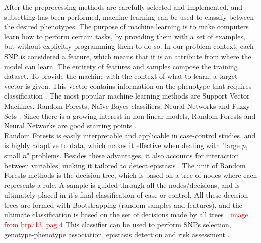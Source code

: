 After the preprocessing methods are carefully selected and implemented, and subsetting has been performed, machine learning can be used to classify between the desired phenotypes. The purpose of machine learning is to make computers learn how to perform certain tasks, by providing them with a set of examples, but without explicitly programming them to do so. In our problem context, each SNP is considered a feature, which means that it is an attribute from where the model can learn. The entirety of features and samples compose the training dataset. To provide the machine with the context of what to learn, a target vector is given. This vector contains information on the phenotype that requires classification \cite{nelson2013higher}. The most popular machine learning methods are Support Vector Machines, Random Forests, Naïve Bayes classifiers, Neural Networks and Fuzzy Sets \cite{szymczak2009machine}. Since there is a growing interest in non-linear models, Random Forests and Neural Networks are good starting points \cite{kavakiotis2017machine}.\\
Random Forests is easily interpretable and applicable in case-control studies, and is highly adaptive to data, which makes it effective when dealing with "large $p$, small $n$" problems. Besides these advantages, it also accounts for interaction between variables, making it tailored to detect epistasis \cite{chen2012random}. The unit of Random Forests methods is the decision tree, which is based on a tree of nodes where each represents a rule. A sample is guided through all the nodes/decisions, and is ultimately placed in it's final classification of case or control. All these decision trees are formed with Bootstrapping (random samples and features), and the ultimate classification is based on the set of decisions made by all trees \cite{moore2010bioinformatics}. \textcolor{red}{image from btp713, pag 4} This classifier can be used to perform SNPs selection, genotype-phenotype association, epistasis detection and risk assessment \cite{meng2009performance, hwang2017biological}. \\
